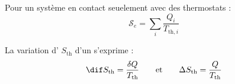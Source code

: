 \begin{propriete}
Pour un système en contact seuelement avec des thermostats :
\[\mathscr{S}_e = \sum_i \frac{Q_i}{T_{\mathrm{th}, i}}\]
\end{propriete}

\begin{propriete}[admis]
La variation d' $S_{\mathrm{th}}$ d'un  s'exprime :
\[\dif S_{\mathrm{th}} = \frac{\delta Q}{T_{\mathrm{th}}} \qquad \text{et} \qquad \Delta S_{\mathrm{th}} = \frac{Q}{T_\mathrm{th}}\]
\end{propriete}